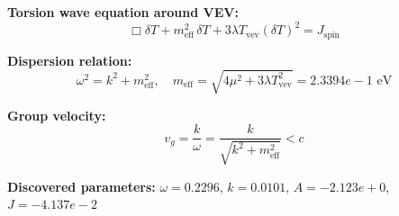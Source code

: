
\textbf{Torsion wave equation around VEV:}
\begin{equation}
  \Box \delta T + m_{\text{eff}}^2 \, \delta T + 3\lambda T_{\text{vev}} (\delta T)^2 = J_{\text{spin}}
\end{equation}

\textbf{Dispersion relation:}
\begin{equation}
  \omega^2 = k^2 + m_{\text{eff}}^2, \quad
  m_{\text{eff}} = \sqrt{4\mu^2 + 3\lambda T_{\text{vev}}^2} = 2.3394e-1 \text{ eV}
\end{equation}

\textbf{Group velocity:}
\begin{equation}
  v_g = \frac{k}{\omega} = \frac{k}{\sqrt{k^2 + m_{\text{eff}}^2}} < c
\end{equation}

\textbf{Discovered parameters:}
$\omega = 0.2296$, \quad
$k = 0.0101$, \quad
$A = -2.123e+0$, \quad
$J = -4.137e-2$